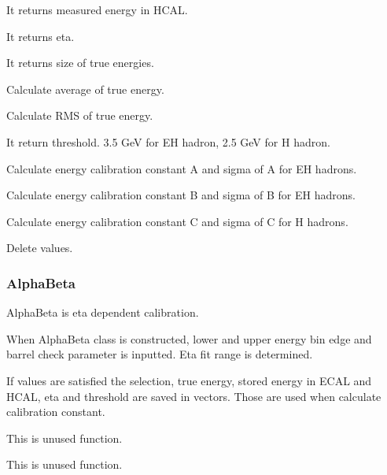 \documentclass{cernrep}
\begin{document}
It returns measured energy in HCAL.


It returns eta.


It returns size of true energies.


Calculate average of true energy.


Calculate RMS of true energy.


It return threshold. 3.5 GeV for EH hadron, 2.5 GeV for H hadron.


Calculate energy calibration constant A and sigma of A for EH hadrons.


Calculate energy calibration constant B and sigma of B for EH hadrons.


Calculate energy calibration constant C and sigma of C for H hadrons.


Delete values.

\subsubsection{AlphaBeta}

AlphaBeta is eta dependent calibration.


When AlphaBeta class is constructed, lower and upper energy bin edge and barrel check parameter is inputted. Eta fit range is determined.


If values are satisfied the selection, true energy, stored energy in ECAL and HCAL, eta and threshold are saved in vectors. Those are used when calculate calibration constant.


This is unused function.


This is unused function.
\end{document}
